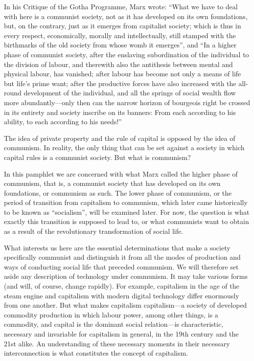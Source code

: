 \documentclass[12pt,a4paper,openany]{book}
\begin{document}
In his Critique of the Gotha Programme, Marx wrote: “What we have to deal with here is a communist society, not as it has developed on its own foundations, but, on the contrary, just as it emerges from capitalist society; which is thus in every respect, economically, morally and intellectually, still stamped with the birthmarks of the old society from whose womb it emerges”, and “In a higher phase of communist society, after the enslaving subordination of the individual to the division of labour, and therewith also the antithesis between mental and physical labour, has vanished; after labour has become not only a means of life but life’s prime want; after the productive forces have also increased with the all-round development of the individual, and all the springs of social wealth flow more abundantly—only then can the narrow horizon of bourgeois right be crossed in its entirety and society inscribe on its banners: From each according to his ability, to each according to his needs!”

The idea of private property and the rule of capital is opposed by the idea of communism. In reality, the only thing that can be set against a society in which capital rules is a communist society. But what is communism?

In this pamphlet we are concerned with what Marx called the higher phase of communism, that is, a communist society that has developed on its own foundations, or communism as such. The lower phase of communism, or the period of transition from capitalism to communism, which later came historically to be known as “socialism”, will be examined later. For now, the question is what exactly this transition is supposed to lead to, or what communists want to obtain as a result of the revolutionary transformation of social life.

What interests us here are the essential determinations that make a society specifically communist and distinguish it from all the modes of production and ways of conducting social life that preceded communism. We will therefore set aside any description of technology under communism. It may take various forms (and will, of course, change rapidly). For example, capitalism in the age of the steam engine and capitalism with modern digital technology differ enormously from one another. But what makes capitalism capitalism—a society of developed commodity production in which labour power, among other things, is a commodity, and capital is the dominant social relation—is characteristic, necessary and invariable for capitalism in general, in the 19th century and the 21st alike. An understanding of these necessary moments in their necessary interconnection is what constitutes the concept of capitalism.
\end{document}

